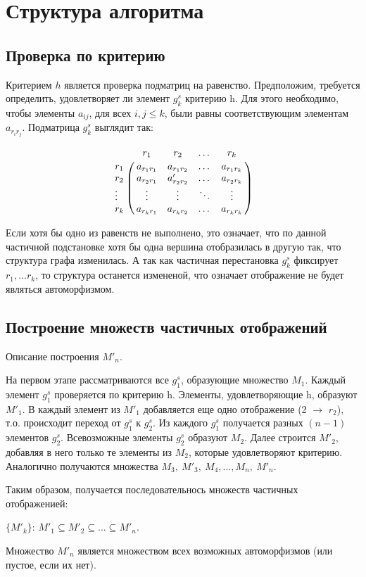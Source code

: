 \section{Структура алгоритма}
\label{sec:AlgoStruct} 
\large

\subsection{Проверка по критерию}

Критерием $h$ является проверка подматриц на равенство. Предположим, требуется определить, удовлетворяет ли элемент $g^s_k$ критерию h. Для этого необходимо, чтобы элементы $a_{ij}$, для всех $i,j \leq k$, были равны соответствующим элементам $a_{r_ir_j}$. Подматрица $g^s_k$ выглядит так:

\[ \bordermatrix{
& r_1 & r_2 & \dots & r_k \cr
r_1 & a_{r_1r_1} & a_{r_1r_2} & \dots & a_{r_1r_k} \cr
r_2 & a_{r_2r_1} & a'_{r_2r_2} & \dots & a_{r_2r_k} \cr
\vdots & \vdots & \vdots & \ddots & \vdots \cr
r_k & a_{r_kr_1} & a_{r_kr_2} & \dots & a_{r_kr_k} \cr}
\]

Если хотя бы одно из равенств не выполнено, это означает, что по данной частичной подстановке хотя бы одна вершина отобразилась в другую так, что структура графа изменилась. А так как частичная перестановка $g^s_k$ фиксирует $r_1, \ldots r_k$, то структура останется измененой, что означает отображение не будет являться автоморфизмом.



\subsection{Построение множеств частичных отображений}

Описание построения $M'_n$.

На первом этапе рассматриваются все $g^s_1$, образующие множество $M_1$. Каждый элемент $g^s_1$ проверяется по критерию h. Элементы, удовлетворяющие h, образуют $M'_1$. В каждый элемент из $M'_1$ добавляется еще одно отображение (2 $\to$ $r_2$), т.о. происходит переход от $g^s_1$ к $g^s_2$. Из каждого $g^s_1$ получается разных $(n-1)$ элементов $g^s_2$. Всевозможные элементы $g^s_2$ образуют $M_2$. Далее строится $M'_2$, добавляя в него только те элементы из $M_2$, которые удовлетворяют критерию. Аналогично получаются множества $M_3,\ M'_3,\ M_4,\ldots, M_n,\ M'_n$.


Таким образом, получается последовательнось множеств частичных отображенией:

$\{M'_k\}$: $M'_1 \subseteq M'_2 \subseteq \ldots \subseteq M'_n$.

Множество $M'_n$ является множеством всех возможных автоморфизмов (или пустое, если их нет).